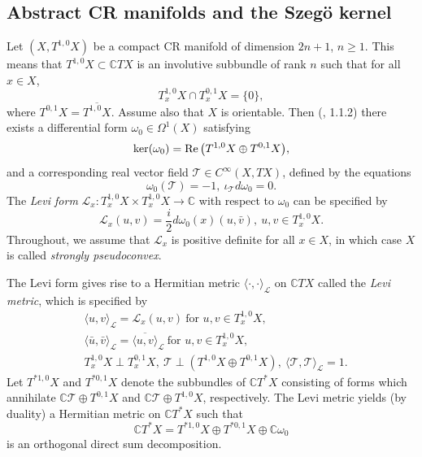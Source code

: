 \documentclass{article}
\newcommand{\CC}{\mathbb C}
\newcommand{\mct}{\mathcal T}
\newcommand{\mcl}{\mathcal L}
\DeclareMathOperator{\re}{Re}
\begin{document}
\subsection{Abstract CR manifolds and the Szeg\"{o} kernel}\label{CR_prelims}

Let $(X, T^{1,0}X)$ be a compact CR manifold of dimension $2n+1$, $n \ge 1$. This means that $T^{1,0}X \subset \CC TX$ is an involutive subbundle of rank $n$ such that for all $x\in X$, $$T^{1,0}_xX\cap T^{0,1}_xX = \{0\},$$ where $T^{0,1}X = \overline{T^{1,0}X}$. Assume also that $X$ is orientable. Then (\cite{drago_tomas}, 1.1.2) there exists a differential form $\omega_0 \in \Omega^1(X)$ satisfying
\begin{equation}\label{contact_form}\ker(\omega_0) = \re\big{(}T^{1,0}X \oplus T^{0,1}X\big{)},\end{equation}
and a corresponding real vector field $\mct \in C^\infty(X, TX)$, defined by the equations
\begin{equation*} \omega_0(\mct) = -1,\ \iota_{\mct} d\omega_0 = 0.\end{equation*}
%
The \textit{Levi form} $\mcl_x : T_x^{1,0}X \times T_x^{1,0}X \to \CC$ with respect to $\omega_0$ can be specified by
\begin{equation}\label{levi_form} \mcl_x(u,v) = \frac i {2} d\omega_0(x) (u, \bar v),\ u,v \in T_x^{1,0}X.\end{equation}
%
Throughout, we assume that $\mcl_x$ is positive definite for all $x \in X$, in which case $X$ is called \textit{strongly pseudoconvex}.

The Levi form gives rise to a Hermitian metric $\langle \cdot, \cdot \rangle_{\mcl}$ on $\CC TX$ called the \textit{Levi metric}, which is specified by
\begin{equation}\label{levi_metric} \begin{aligned} &\langle u, v \rangle_{\mcl} = \mcl_x(u, v)\ \text{for } u,v \in T^{1,0}_x X,\\ &\langle \bar u, \bar v \rangle_{\mcl} = \overline{\langle u, v \rangle}_{\mcl} \ \text{for } u,v \in T^{1,0}_x X,\\ & T^{1,0}_xX \perp T^{0,1}_xX,\ \mct \perp (T^{1,0}X \oplus T^{0,1}X),\ \langle \mct, \mct \rangle_{\mcl} = 1.\end{aligned} \end{equation} 
%
Let $T^{*1,0}X$ and $T^{*0,1}X$ denote the subbundles of $\CC T^*X$ consisting of forms which annihilate $\CC \mct \oplus T^{0,1}X$ and $\CC \mct \oplus T^{1,0}X$, respectively.
The Levi metric yields (by duality) a Hermitian metric on $\CC T^*X$ such that
\begin{equation*} \CC T^*X = T^{*1,0}X \oplus T^{*0,1}X \oplus \CC \omega_0\end{equation*}
is an orthogonal direct sum decomposition.
\end{document}
